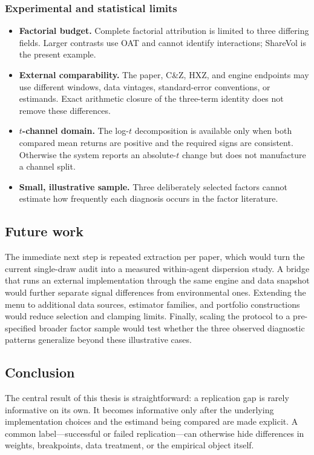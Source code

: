 \subsubsection{Experimental and statistical limits}
\begin{itemize}
  \item \textbf{Factorial budget.} Complete factorial attribution is limited
    to three differing fields. Larger contrasts use OAT and cannot identify
    interactions; ShareVol is the present example.
  \item \textbf{External comparability.} The paper, C\&Z, HXZ, and engine
    endpoints may use different windows, data vintages, standard-error
    conventions, or estimands. Exact arithmetic closure of the three-term
    identity does not remove these differences.
  \item \textbf{$t$-channel domain.} The log-$t$ decomposition is available
    only when both compared mean returns are positive and the required signs
    are consistent. Otherwise the system reports an absolute-$t$ change but
    does not manufacture a channel split.
  \item \textbf{Small, illustrative sample.} Three deliberately selected
    factors cannot estimate how frequently each diagnosis occurs in the
    factor literature.
\end{itemize}

\subsection{Future work}

The immediate next step is repeated extraction per paper, which would turn
the current single-draw audit into a measured within-agent dispersion study.
A bridge that runs an external implementation through the same engine and
data snapshot would further separate signal differences from environmental
ones. Extending the menu to additional data sources, estimator families, and
portfolio constructions would reduce selection and clamping limits. Finally,
scaling the protocol to a pre-specified broader factor sample would test
whether the three observed diagnostic patterns generalize beyond these
illustrative cases.

\subsection{Conclusion}

The central result of this thesis is straightforward: a replication gap is
rarely informative on its own. It becomes informative only after the
underlying implementation choices and the estimand being compared are made
explicit. A common label---successful or failed replication---can otherwise
hide differences in weights, breakpoints, data treatment, or the empirical
object itself.

